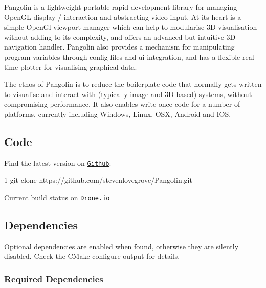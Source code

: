 Pangolin is a lightweight portable rapid development library for managing Open\+GL display / interaction and abstracting video input. At its heart is a simple Open\+Gl viewport manager which can help to modularise 3D visualisation without adding to its complexity, and offers an advanced but intuitive 3D navigation handler. Pangolin also provides a mechanism for manipulating program variables through config files and ui integration, and has a flexible real-\/time plotter for visualising graphical data.

The ethos of Pangolin is to reduce the boilerplate code that normally gets written to visualise and interact with (typically image and 3D based) systems, without compromising performance. It also enables write-\/once code for a number of platforms, currently including Windows, Linux, O\+SX, Android and I\+OS.

\subsection*{Code}

Find the latest version on \href{http://github.com/stevenlovegrove/Pangolin}{\tt Github}\+:


\begin{DoxyCode}
1 git clone https://github.com/stevenlovegrove/Pangolin.git
\end{DoxyCode}


Current build status on \href{https://drone.io/github.com/stevenlovegrove/Pangolin}{\tt Drone.\+io} 

\subsection*{Dependencies}

Optional dependencies are enabled when found, otherwise they are silently disabled. Check the C\+Make configure output for details.

\subsubsection*{Required Dependencies}


